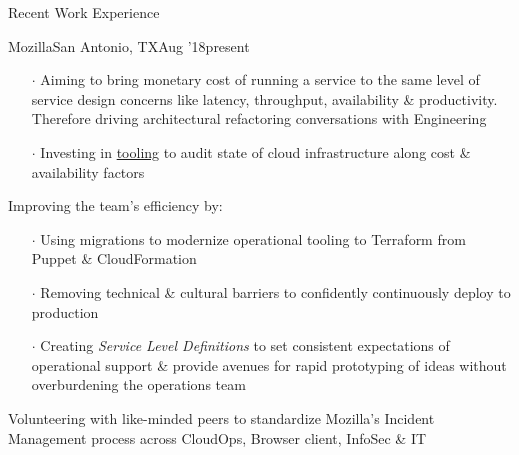 \documentclass{resume} %
\begin{document}
\begin{rSection}{Recent Work Experience}
\begin{rSubsection}{Mozilla}{San Antonio, TX}{Aug '18}{present}
\begin{itemize}
    \item[$\cdot$] Aiming to bring monetary cost of running a service to the same level of service design concerns like latency, throughput, availability \& productivity. Therefore driving architectural refactoring conversations with Engineering
    \item[$\cdot$] Investing in \href{https://github.com/mozilla/frost}{tooling} to audit state of cloud infrastructure along cost \& availability factors
    \end{itemize}
  \item Improving the team's efficiency by:
     \vspace{-0.5em}
    \begin{itemize} \itemsep0.5pt \parskip0pt 
  \item[$\cdot$] Using migrations to modernize operational tooling to Terraform from Puppet \& CloudFormation
  \item[$\cdot$] Removing technical \& cultural barriers to confidently continuously deploy to production
  \item[$\cdot$] Creating \textit{Service Level Definitions} to set consistent expectations of operational support \& provide avenues for rapid prototyping of ideas without overburdening the operations team
        \end{itemize}
  \item Volunteering with like-minded peers to standardize Mozilla's Incident Management process across CloudOps, Browser client, InfoSec \& IT
\end{rSubsection}



\end{rSection}
\end{document}
